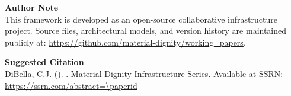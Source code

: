 % 

\vspace{1cm}
\noindent\textbf{Author Note}\\
This framework is developed as an open-source collaborative infrastructure project. 
Source files, architectural models, and version history are maintained publicly at: 
\url{https://github.com/material-dignity/working_papers}.

\vspace{0.5cm}
\noindent\textbf{Suggested Citation}\\
DiBella, C.J. (\paperdate). \textit{\papertitle}. Material Dignity Infrastructure Series. 
Available at SSRN: \url{https://ssrn.com/abstract=\paperid}

\newpage
